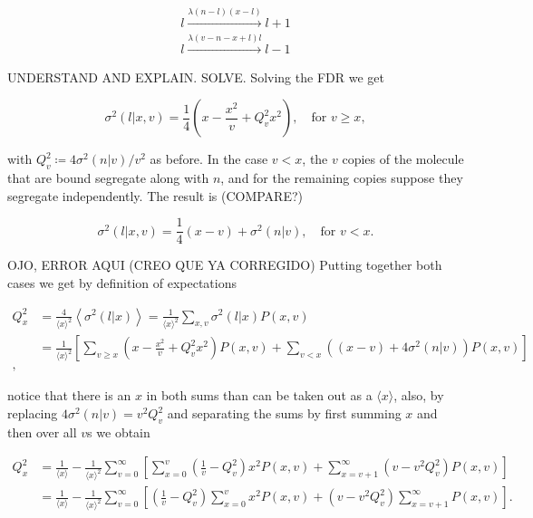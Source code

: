 \begin{equation}
  \begin{split}
    l\xrightarrow{\lambda(n-l)(x-l)}l+1\\
    l\xrightarrow{\lambda(v-n-x+l)l}l-1
  \end{split}
\end{equation}

UNDERSTAND AND EXPLAIN. SOLVE. Solving the FDR we get

\begin{equation}
  \sigma^2(l|x,v) =\frac{1}{4}\left(x-\frac{x^2}{v}+Q_v^2x^2\right),\quad \text{for } v\geq x,
\end{equation}

with $Q_v^2 \coloneqq 4\sigma^2(n|v)/v^2$ as before. In the case $v<x$, the $v$ copies of the molecule that are bound segregate along with $n$, and for the remaining copies suppose they segregate independently. The result is (COMPARE?)

\begin{equation}
  \sigma^2(l|x,v) = \frac{1}{4}(x-v) + \sigma^2(n|v),\quad \text{for } v<x.
\end{equation}

OJO, ERROR AQUI (CREO QUE YA CORREGIDO)
Putting together both cases we get by definition of expectations

\begin{equation*}
  \begin{split}
    Q_x^2 &= \frac{4}{\langle x\rangle^2}\left\langle\sigma^2(l|x)\right\rangle = \frac{1}{\langle x\rangle^2}\sum_{x,v}\sigma^2(l|x)P(x,v)\\
    &=\frac{1}{\langle x\rangle^2}\left[\sum_{v\geq x}\left(x-\frac{x^2}{v}+Q_v^2x^2\right)P(x,v) + \sum_{v<x}\left((x-v)+4\sigma^2(n|v)\right)P(x,v)\right]\\,
  \end{split}
\end{equation*}

notice that there is an $x$ in both sums than can be taken out as a $\langle x\rangle$, also, by replacing $4\sigma^2(n|v) = v^2Q_v^2$ and separating the sums by first summing $x$ and then over all $v$s we obtain

\begin{equation}
  \begin{split}
     Q_x^2 &= \frac{1}{\langle x\rangle} - \frac{1}{\langle x\rangle^2}\sum_{v=0}^\infty\left[\sum_{x=0}^v\left(\frac{1}{v}-Q_v^2\right)x^2P(x,v)+\sum_{x=v+1}^\infty\left(v-v^2Q_v^2\right)P(x,v)\right]\\
     &=\frac{1}{\langle x\rangle} - \frac{1}{\langle x\rangle^2}\sum_{v=0}^\infty\left[\left(\frac{1}{v}-Q_v^2\right)\sum_{x=0}^vx^2P(x,v)+\left(v-v^2Q_v^2\right)\sum_{x=v+1}^\infty P(x,v)\right].
  \end{split}
\end{equation}

